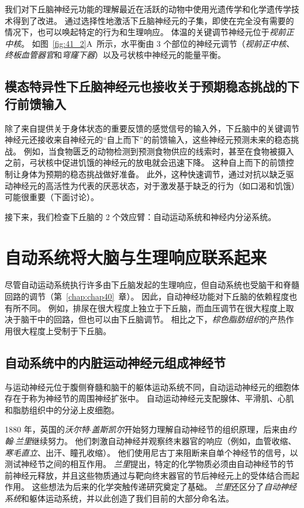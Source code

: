 我们对下丘脑神经元功能的理解最近在活跃的动物中使用光遗传学和化学遗传学技术得到了改进。
通过选择性地激活下丘脑神经元的子集，即使在完全没有需要的情况下，也可以唤起特定的行为和生理响应。
体温的关键调节神经元位于\textit{视前正中核}。
如图~\ref{fig:41_2}A~所示，水平衡由 3 个部位的神经元调节（\textit{视前正中核}、\textit{终板血管器官}和\textit{穹窿下器}）以及弓状核中神经元的能量平衡。



\subsection{模态特异性下丘脑神经元也接收关于预期稳态挑战的下行前馈输入}

除了来自提供关于身体状态的重要反馈的感觉信号的输入外，下丘脑中的关键调节神经元还接收来自神经元的“自上而下”的前馈输入，这些神经元预测未来的稳态挑战。
例如，当食物匮乏的动物检测到预测食物供应的线索时，甚至在食物被摄入之前，弓状核中促进饥饿的神经元的放电就会迅速下降。
这种自上而下的前馈控制让身体为预期的稳态挑战做好准备。
此外，这种快速调节，通过对抗以缺乏驱动神经元的高活性为代表的厌恶状态，对于激发基于缺乏的行为（如口渴和饥饿）可能很重要（下面讨论）。


接下来，我们检查下丘脑的 2 个效应臂：自动运动系统和神经内分泌系统。



\section{自动系统将大脑与生理响应联系起来}

尽管自动运动系统执行许多由下丘脑发起的生理响应，但自动系统也受脑干和脊髓回路的调节（第~\ref{chap:chap40}~章）。
因此，自动神经功能对下丘脑的依赖程度也有所不同。
例如，排尿在很大程度上独立于下丘脑，而血压调节在很大程度上取决于脑干中的回路，但也可以由下丘脑调节。
相比之下，\textit{棕色脂肪组织}的产热作用很大程度上受制于下丘脑。



\subsection{自动系统中的内脏运动神经元组成神经节}

与运动神经元位于腹侧脊髓和脑干的躯体运动系统不同，自动运动神经元的细胞体存在于称为神经节的周围神经扩张中。
自动运动神经元支配腺体、平滑肌、心肌和脂肪组织中的分泌上皮细胞。


1880 年，英国的\textit{沃尔特$\cdot$盖斯凯尔}开始努力理解自动神经节的组织原理，后来由\textit{约翰$\cdot$兰里}继续努力。
他们刺激自动神经并观察终末器官的响应（例如，血管收缩、\textit{寒毛直立}、出汗、瞳孔收缩）。
他们使用尼古丁来阻断来自单个神经节的信号，以测试神经节之间的相互作用。
\textit{兰里}提出，特定的化学物质必须由自动神经节的节前神经元释放，并且这些物质通过与靶向终末器官的节后神经元上的受体结合而起作用。
这些想法为后来的化学突触传递研究奠定了基础。
\textit{兰里}还区分了\textit{自动神经系统}和躯体运动系统，并以此创造了我们目前的大部分命名法。


